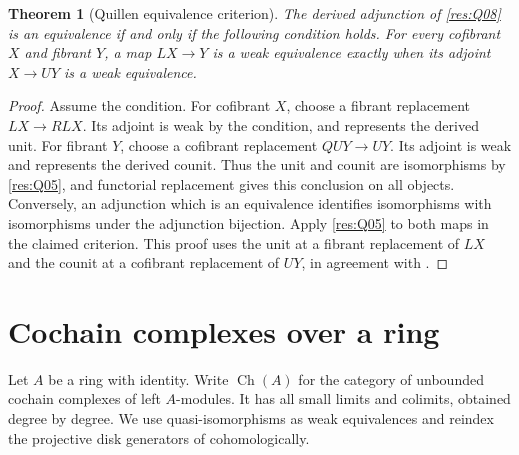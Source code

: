 \documentclass[11pt,oneside,openany]{book}
\newtheorem{theorem}{Theorem}[chapter]
\theoremstyle{definition}
\theoremstyle{remark}
\begin{document}
\begin{theorem}[Quillen equivalence criterion]\label{res:Q09}
The derived adjunction of \ref{res:Q08} is an equivalence
if and only if the following condition holds. For every
cofibrant \(X\) and fibrant \(Y\), a map \(LX\to Y\) is
a weak equivalence exactly when its adjoint \(X\to UY\)
is a weak equivalence.
\end{theorem}
\begin{proof}
Assume the condition. For cofibrant \(X\), choose a
fibrant replacement \(LX\to R LX\). Its adjoint is
weak by the condition, and represents the derived unit.
For fibrant \(Y\), choose a cofibrant replacement
\(Q UY\to UY\). Its adjoint is weak and represents
the derived counit. Thus the unit and counit are
isomorphisms by \ref{res:Q05}, and functorial
replacement gives this conclusion on all objects.
Conversely, an adjunction which is an equivalence
identifies isomorphisms with isomorphisms under the
adjunction bijection. Apply \ref{res:Q05} to both
maps in the claimed criterion. This proof uses the
unit at a fibrant replacement of \(LX\) and the
counit at a cofibrant replacement of \(UY\), in agreement
with \cite[correction to Corollary 1.3.16]{hovey-errata}.
\end{proof}


\section{Cochain complexes over a ring}

Let \(A\) be a ring with identity. Write \(\operatorname{Ch}(A)\)
for the category of unbounded cochain complexes of left \(A\)-modules.
It has all small limits and colimits, obtained degree by degree.
We use quasi-isomorphisms as weak equivalences and reindex the
projective disk generators of \cite[Section 2.3]{hovey} cohomologically.
\end{document}
